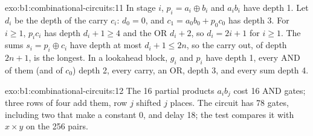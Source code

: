 \begin{solution}{exo:b1:combinational-circuits:11}
In stage $i$, $p_i = a_i \oplus b_i$ and $a_i b_i$ have depth 1. Let $d_i$ be the depth of the carry $c_i$: $d_0 = 0$, and
$c_1 = a_0 b_0 + p_0 c_0$ has depth 3. For $i \geq 1$, $p_i c_i$ has depth $d_i + 1 \geq 4$ and the OR $d_i + 2$, so $d_i =
2i + 1$ for $i \geq 1$. The sums $s_i = p_i \oplus c_i$ have depth at most $d_i + 1 \leq 2n$, so the carry out, of depth
$2n + 1$, is the longest. In a lookahead block, $g_i$ and $p_i$ have depth 1, every AND of them (and of $c_0$) depth 2,
every carry, an OR, depth 3, and every sum depth 4.
\end{solution}

\begin{solution}{exo:b1:combinational-circuits:12}
The 16 partial products $a_i b_j$ cost 16 AND gates; three rows of four  add them, row $j$ shifted $j$ places.
The circuit has 78 gates, including two that make a constant 0, and delay 18; the test compares it with $x \times y$ on
the 256 pairs.
\end{solution}

